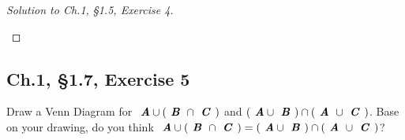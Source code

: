 \documentclass[12pt]{amsart}
\numberwithin{equation}{section}
\theoremstyle{definition}
\theoremstyle{remark}
\begin{document}
\begin{proof}[Solution to Ch.1, \S 1.5,  Exercise 4] \ \\

\begin{center}

\def\firstcircle{(0,0) circle (1.5cm)}
\def\secondcircle{(45:2cm) circle (1.5cm)}
\def\thirdcircle{(0:2cm) circle (1.5cm)}

\end{center}

\end{proof}



\subsection*{Ch.1, \S 1.7,  Exercise 5} Draw a Venn Diagram for $ \textbf{ \textit{A}} \cup ( \textbf{ \textit{B} }  \cap \textbf{ \textit{C} } ) $ and $ ( \textbf{ \textit{A}} \cup \textbf{ \textit{B} } ) \cap ( \textbf{ \textit{A} } \cup \textbf{ \textit{C} } ) $. Base on your drawing, do you think $ \textbf{ \textit{A}} \cup ( \textbf{ \textit{B} }  \cap \textbf{ \textit{C} } ) = ( \textbf{ \textit{A}} \cup \textbf{ \textit{B} } ) \cap ( \textbf{ \textit{A} } \cup \textbf{ \textit{C} } ) $?
\end{document}
